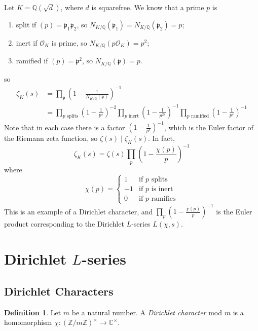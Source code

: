 \documentclass[11pt]{article}
\theoremstyle{definition}
\newtheorem{definition}{Definition}[section]
\theoremstyle{plain}
\theoremstyle{remark}
\newcommand{\ZZ}{\mathbb{Z}}
\newcommand{\QQ}{\mathbb{Q}}
\newcommand{\CC}{\mathbb{C}}
\newcommand{\cO}{\mathcal{O}}
\newcommand{\fp}{\mathfrak{p}}
\begin{document}
\noindent Let $K = \QQ(\sqrt{d})$, where $d$ is squarefree. We know that a prime $p$ is
\begin{enumerate}
    \item split if $(p) = \fp_1 \fp_2$, so $N_{K/\QQ}(\fp_1) = N_{K/\QQ}(\fp_2) = p$;
    \item inert if $\cO_K$ is prime, so $N_{K/\QQ} (p \cO_K) = p^2$;
    \item ramified if $(p) = \fp^2$, so $N_{K/\QQ}(\fp) = p$.
\end{enumerate}
so
\begin{align*}
    \zeta_K(s)
    &= \prod_{\fp} \left(1 - \frac{1}{N_{K/\QQ}(\fp)}\right)^{-1}\\
    &= \prod_{p \text{ splits}} \left(1 - \frac{1}{p^s}\right)^{-2} \prod_{p \text{ inert}} \left(1 - \frac{1}{p^{2s}}\right)^{-1} \prod_{p \text{ ramified}} \left(1 - \frac{1}{p^s}\right)^{-1}
\end{align*}
Note that in each case there is a factor $\left(1-\frac{1}{p^s}\right)^{-1}$, which is the Euler factor of the Riemann zeta function, so $\zeta(s) \mid \zeta_K(s)$. In fact,
\begin{equation*}
    \zeta_K(s) = \zeta(s) \prod_p \left(1 - \frac{\chi(p)}{p}\right)^{-1}
\end{equation*}
where
\begin{equation*}
    \chi(p) = \begin{cases}
        1 & \text{if } p \text{ splits}\\
        -1 & \text{if } p \text{ is inert}\\
        0 & \text{if } p \text{ ramifies}
    \end{cases}
\end{equation*}
This is an example of a Dirichlet character, and $\prod_p \left(1 - \frac{\chi(p)}{p}\right)^{-1}$ is the Euler product corresponding to the Dirichlet $L$-series $L(\chi, s)$.

\section{Dirichlet \texorpdfstring{$L$}{L}-series}

\subsection{Dirichlet Characters}

\begin{definition}\label{def:7_1}
    Let $m$ be a natural number. A \emph{Dirichlet character} mod $m$ is a homomorphism $\chi : (\ZZ/m\ZZ)^\times \to \CC^\times$.
\end{definition}
\end{document}
